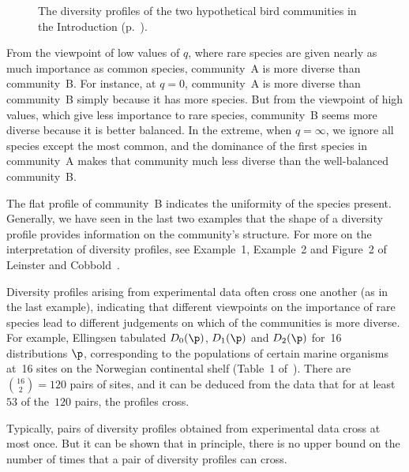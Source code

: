 \begin{example}
\begin{figure}
\begin{picture}
% 
\end{picture}
\caption{The diversity profiles of the two hypothetical bird communities in
  the Introduction (p.~\pageref{p:intro-birds}).}  
\end{figure}
% 
From the viewpoint%
%
% 
of low values of $q$, where rare species are given
nearly as much importance as common species, community~A is more diverse
than community~B.  For instance, at $q = 0$, community~A is more diverse
than community~B simply because it has more species.  But from the
viewpoint of high values, which give less importance to rare species,
community~B seems more diverse because it is better balanced.  In the
extreme, when $q = \infty$, we ignore all species except the most common,
and the dominance of the first species in community~A makes that community
much less diverse than the well-balanced community~B.

The flat profile of community~B indicates the uniformity of the species
present.  Generally, we have seen in the last two examples that the shape
of a diversity profile provides information on the community's structure.
For more on the interpretation of diversity profiles, see Example~1,
Example~2 and Figure~2 of Leinster and Cobbold~\cite{MDISS}.%
%
\end{example}

\begin{example}
Diversity profiles arising from experimental data often cross one another
(as in the last example), indicating that different viewpoints%
%
% 
on the importance of rare species lead to different judgements on which of
the communities is more diverse.  For example, Ellingsen tabulated
$D_0(\p)$, $D_1(\p)$ and $D_2(\p)$ for~16 distributions $\p$, corresponding
to the populations of certain marine organisms at~16 sites on the Norwegian
continental shelf (Table~1 of~\cite{Elli}).  There are $\binom{16}{2} =
120$ pairs of sites, and it can be deduced from the data that for at
least~$53$ of the~$120$ pairs, the profiles cross.

Typically, pairs of diversity profiles obtained from experimental data
cross at most once.  But it can be shown that in principle, there is no
upper bound on the number of times that a pair of diversity profiles can
cross. 
\end{example}


